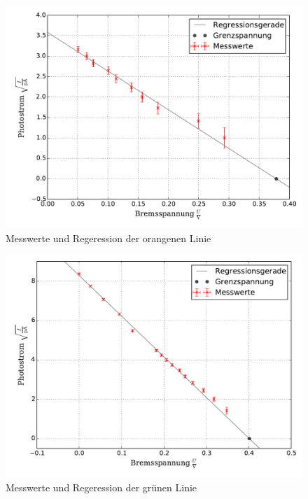 		\begin{figure}[!h]
			\centering
			\includegraphics[scale=0.7]{Grafiken/Orange.pdf}
			\caption{Messwerte und Regeression der orangenen Linie \label{fig:Messwerte_Orange}}
		\end{figure}
		\begin{figure}[!h]
			\centering
			\includegraphics[scale=0.7]{Grafiken/Gruen.pdf}
			\caption{Messwerte und Regeression der grünen Linie \label{fig:Messwerte_Gruen}}
		\end{figure}
